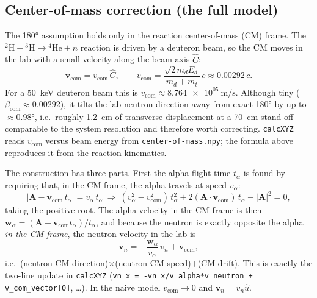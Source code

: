\documentclass[11pt]{article}
\newcommand{\code}[1]{\texttt{\small #1}}
\begin{document}
\subsection{Center-of-mass correction (the full model)}
The \ang{180} assumption holds only in the reaction center-of-mass (CM) frame.
The $\mathrm{{}^2H}+\mathrm{{}^3H}\rightarrow\mathrm{{}^4He}+n$ reaction is driven
by a deuteron beam, so the CM moves in the lab with a small velocity along the
beam axis $\hat C$:
\begin{equation}
  \bm v_{\mathrm{com}}=v_{\mathrm{com}}\,\hat C,\qquad
  v_{\mathrm{com}}=\frac{\sqrt{2\,m_d E_d}}{m_d+m_t}\,c\approx 0.00292\,c .
\end{equation}
For a \SI{50}{\keV} deuteron beam this is
$v_{\mathrm{com}}\approx\SI{8.764e+05}{\meter\per\second}$. Although tiny
($\beta_{\mathrm{com}}\approx0.00292$), it tilts the lab neutron direction away
from exact \ang{180} by up to ${\approx}\ang{0.98}$, i.e.\ roughly
\SI{1.2}{\cm} of transverse displacement at a \SI{70}{\cm} stand-off ---
comparable to the system resolution and therefore worth correcting.
\code{calcXYZ} reads $v_{\mathrm{com}}$ versus beam energy from
\code{center-of-mass.npy}; the formula above reproduces it from the reaction
kinematics.

The construction has three parts. First the alpha flight time $t_\alpha$ is found
by requiring that, in the CM frame, the alpha travels at speed $v_\alpha$:
\begin{equation}
  |\bm A-\bm v_{\mathrm{com}}\,t_\alpha|=v_\alpha\,t_\alpha
  \ \Longrightarrow\
  (v_\alpha^2-v_{\mathrm{com}}^2)\,t_\alpha^2
   +2(\bm A\cdot\bm v_{\mathrm{com}})\,t_\alpha-|\bm A|^2=0,
\end{equation}
taking the positive root. The alpha velocity in the CM frame is then
$\bm w_\alpha=(\bm A-\bm v_{\mathrm{com}}t_\alpha)/t_\alpha$, and because the
neutron is exactly opposite the alpha \emph{in the CM frame}, the neutron
velocity in the lab is
\begin{equation}
  \bm v_n=-\frac{\bm w_\alpha}{v_\alpha}\,v_n+\bm v_{\mathrm{com}},
\end{equation}
i.e.\ (neutron CM direction)$\times$(neutron CM speed)$+$(CM drift). This is
exactly the two-line update in \code{calcXYZ}
(\code{vn\_x = -vn\_x/v\_alpha*v\_neutron + v\_com\_vector[0]}, \ldots). In the
naive model $v_{\mathrm{com}}\to0$ and $\bm v_n=v_n\hat u$.
\end{document}
